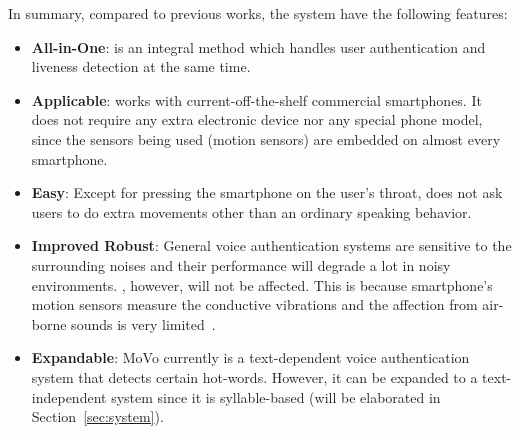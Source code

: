 In summary, compared to previous works, the {\shortname} system have the following features:
\begin{itemize}
	\item \textbf{All-in-One}: {\shortname} is an integral method which handles user authentication and liveness detection at the same time.
	
	\item \textbf{Applicable}: {\shortname} works with current-off-the-shelf commercial smartphones. It does not require any extra electronic device nor any special phone model, since the sensors being used (motion sensors) are embedded on almost every smartphone.
	
	\item \textbf{Easy}: Except for pressing the smartphone on the user’s throat, {\shortname} does not ask users to do extra movements other than an ordinary speaking behavior. 
	
	\item \textbf{Improved Robust}: General voice authentication systems are sensitive to the surrounding noises and their performance will degrade a lot in noisy environments. {\shortname}, however, will not be affected. This is because smartphone's motion sensors measure the conductive vibrations and the affection from air-borne sounds is very limited~\cite{anand2018speechless}.

	\item \textbf{Expandable}: MoVo currently is a text-dependent voice authentication system that detects certain hot-words. However, it can be expanded to a text-independent system since it is syllable-based (will be elaborated in Section~\ref{sec:system}).
	
\end{itemize}